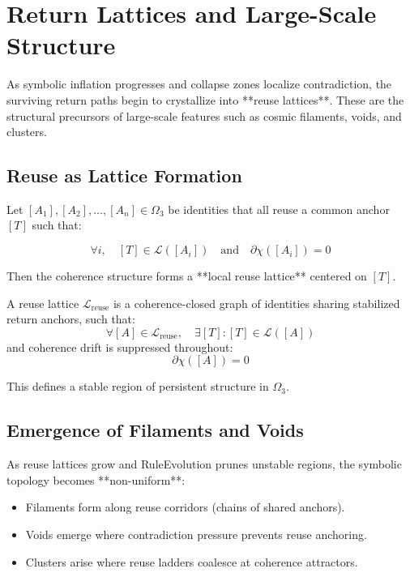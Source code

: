 \chapter{Return Lattices and Large-Scale Structure} \label{chapter:return-lattices}

As symbolic inflation progresses and collapse zones localize contradiction, the surviving return paths begin to crystallize into **reuse lattices**. These are the structural precursors of large-scale features such as cosmic filaments, voids, and clusters.

\section{Reuse as Lattice Formation}

Let $[A_1], [A_2], \ldots, [A_n] \in \Omega_3$ be identities that all reuse a common anchor $[T]$ such that:

\[
\forall i,\quad [T] \in \mathcal{L}([A_i]) \quad \text{and} \quad \partial \chi([A_i]) = 0
\]

Then the coherence structure forms a **local reuse lattice** centered on $[T]$.

\begin{definition}
A reuse lattice $\mathcal{L}_\text{reuse}$ is a coherence-closed graph of identities sharing stabilized return anchors, such that:
\[
\forall [A] \in \mathcal{L}_\text{reuse},\quad \exists [T] : [T] \in \mathcal{L}([A])
\]
and coherence drift is suppressed throughout:
\[
\partial \chi([A]) = 0
\]
\end{definition}

This defines a stable region of persistent structure in $\Omega_3$.

\section{Emergence of Filaments and Voids}

As reuse lattices grow and RuleEvolution prunes unstable regions, the symbolic topology becomes **non-uniform**:

\begin{itemize}
  \item Filaments form along reuse corridors (chains of shared anchors).
  \item Voids emerge where contradiction pressure prevents reuse anchoring.
  \item Clusters arise where reuse ladders coalesce at coherence attractors.
\end{itemize}


